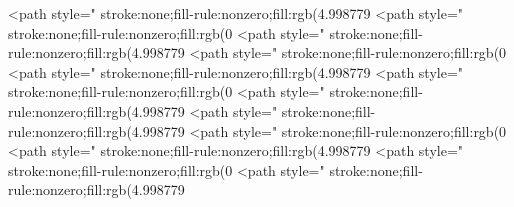 <path style=" stroke:none;fill-rule:nonzero;fill:rgb(4.998779%
<path style=" stroke:none;fill-rule:nonzero;fill:rgb(0%
<path style=" stroke:none;fill-rule:nonzero;fill:rgb(4.998779%
<path style=" stroke:none;fill-rule:nonzero;fill:rgb(0%
<path style=" stroke:none;fill-rule:nonzero;fill:rgb(4.998779%
<path style=" stroke:none;fill-rule:nonzero;fill:rgb(0%
<path style=" stroke:none;fill-rule:nonzero;fill:rgb(4.998779%
<path style=" stroke:none;fill-rule:nonzero;fill:rgb(4.998779%
<path style=" stroke:none;fill-rule:nonzero;fill:rgb(0%
<path style=" stroke:none;fill-rule:nonzero;fill:rgb(4.998779%
<path style=" stroke:none;fill-rule:nonzero;fill:rgb(0%
<path style=" stroke:none;fill-rule:nonzero;fill:rgb(4.998779%
